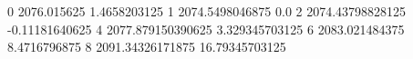 0 2076.015625 1.4658203125
1 2074.5498046875 0.0
2 2074.43798828125 -0.11181640625
4 2077.879150390625 3.329345703125
6 2083.021484375 8.4716796875
8 2091.34326171875 16.79345703125

